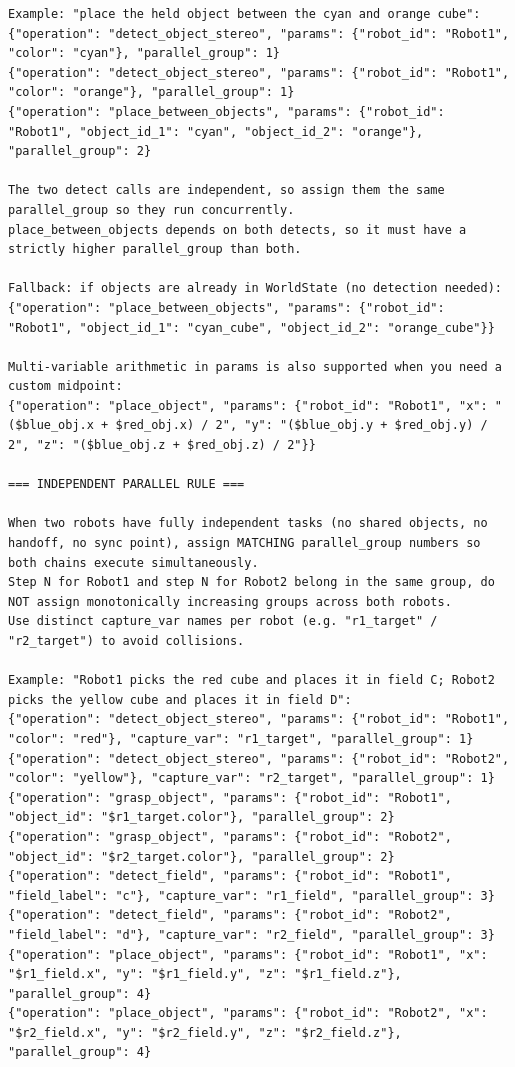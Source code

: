 \documentclass[
     12pt,
     a4paper,
     BCOR=10mm,
     DIV=14,
     listof=totoc,
     bibliography=totoc,
     parskip,
     twoside,
     headsepline
     ]{scrreprt}
\begin{document}
\begin{lstlisting}[caption={The few-shot and rule-based system prompt for the command parser.}, extendedchars=true]
Example: "place the held object between the cyan and orange cube":
{"operation": "detect_object_stereo", "params": {"robot_id": "Robot1", "color": "cyan"}, "parallel_group": 1}
{"operation": "detect_object_stereo", "params": {"robot_id": "Robot1", "color": "orange"}, "parallel_group": 1}
{"operation": "place_between_objects", "params": {"robot_id": "Robot1", "object_id_1": "cyan", "object_id_2": "orange"}, "parallel_group": 2}

The two detect calls are independent, so assign them the same parallel_group so they run concurrently.
place_between_objects depends on both detects, so it must have a strictly higher parallel_group than both.

Fallback: if objects are already in WorldState (no detection needed):
{"operation": "place_between_objects", "params": {"robot_id": "Robot1", "object_id_1": "cyan_cube", "object_id_2": "orange_cube"}}

Multi-variable arithmetic in params is also supported when you need a custom midpoint:
{"operation": "place_object", "params": {"robot_id": "Robot1", "x": "($blue_obj.x + $red_obj.x) / 2", "y": "($blue_obj.y + $red_obj.y) / 2", "z": "($blue_obj.z + $red_obj.z) / 2"}}

=== INDEPENDENT PARALLEL RULE ===

When two robots have fully independent tasks (no shared objects, no handoff, no sync point), assign MATCHING parallel_group numbers so both chains execute simultaneously.
Step N for Robot1 and step N for Robot2 belong in the same group, do NOT assign monotonically increasing groups across both robots.
Use distinct capture_var names per robot (e.g. "r1_target" / "r2_target") to avoid collisions.

Example: "Robot1 picks the red cube and places it in field C; Robot2 picks the yellow cube and places it in field D":
{"operation": "detect_object_stereo", "params": {"robot_id": "Robot1", "color": "red"}, "capture_var": "r1_target", "parallel_group": 1}
{"operation": "detect_object_stereo", "params": {"robot_id": "Robot2", "color": "yellow"}, "capture_var": "r2_target", "parallel_group": 1}
{"operation": "grasp_object", "params": {"robot_id": "Robot1", "object_id": "$r1_target.color"}, "parallel_group": 2}
{"operation": "grasp_object", "params": {"robot_id": "Robot2", "object_id": "$r2_target.color"}, "parallel_group": 2}
{"operation": "detect_field", "params": {"robot_id": "Robot1", "field_label": "c"}, "capture_var": "r1_field", "parallel_group": 3}
{"operation": "detect_field", "params": {"robot_id": "Robot2", "field_label": "d"}, "capture_var": "r2_field", "parallel_group": 3}
{"operation": "place_object", "params": {"robot_id": "Robot1", "x": "$r1_field.x", "y": "$r1_field.y", "z": "$r1_field.z"}, "parallel_group": 4}
{"operation": "place_object", "params": {"robot_id": "Robot2", "x": "$r2_field.x", "y": "$r2_field.y", "z": "$r2_field.z"}, "parallel_group": 4}


\end{lstlisting}
\end{document}
